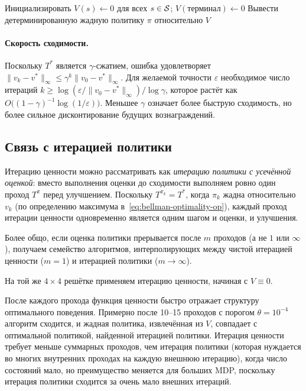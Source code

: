 \begin{algorithm}[ht]
\caption{Итерация ценности}
\label{alg:value-iteration}
Инициализировать $V(s) \leftarrow 0$ для всех $s \in \mathcal{S}$; $V(\mbox{терминал}) \leftarrow 0$\;
Вывести детерминированную жадную политику $\pi$ относительно $V$\;
\end{algorithm}

\paragraph{Скорость сходимости.}
Поскольку $T^*$ является $\gamma$-сжатием, ошибка удовлетворяет $\|v_k - v^*\|_\infty \le \gamma^k \|v_0 - v^*\|_\infty$.  Для желаемой точности $\varepsilon$ необходимое число итераций $k \ge \log(\varepsilon / \|v_0 - v^*\|_\infty) / \log \gamma$, которое растёт как $O\!\bigl((1-\gamma)^{-1}\log(1/\varepsilon)\bigr)$.  Меньшее $\gamma$ означает более быструю сходимость, но более сильное дисконтирование будущих вознаграждений.

\subsection*{Связь с итерацией политики}

Итерацию ценности можно рассматривать как \emph{итерацию политики с усечённой оценкой}: вместо выполнения оценки до сходимости выполняем ровно один проход $T^\pi$ перед улучшением.  Поскольку $T^{\pi_k} = T^*$, когда $\pi_k$ жадна относительно $v_k$ (по определению максимума в~\eqref{eq:bellman-optimality-op}), каждый проход итерации ценности одновременно является одним шагом и оценки, и улучшения.

Более общо, если оценка политики прерывается после $m$ проходов (а не $1$ или $\infty$), получаем семейство алгоритмов, интерполирующих между чистой итерацией ценности ($m=1$) и итерацией политики ($m \to \infty$).

\begin{example}
\label{ex:vi-gridworld}
На той же $4\times4$ решётке применяем итерацию ценности, начиная с $V \equiv 0$.

После каждого прохода функция ценности быстро отражает структуру оптимального поведения.  Примерно после 10--15 проходов с порогом $\theta = 10^{-4}$ алгоритм сходится, и жадная политика, извлечённая из $V$, совпадает с оптимальной политикой, найденной итерацией политики.  Итерация ценности требует меньше суммарных проходов, чем итерация политики (которая нуждается во многих внутренних проходах на каждую внешнюю итерацию), когда число состояний мало, но преимущество меняется для больших MDP, поскольку итерация политики сходится за очень мало внешних итераций.
\end{example}

